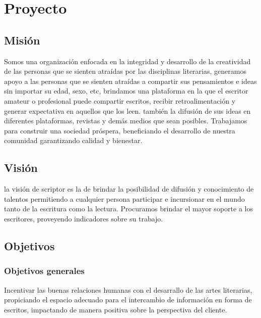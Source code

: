 \chapter{Proyecto}

\section{Misión}
	Somos una organización enfocada en la integridad y desarrollo de la creatividad de las personas que se sienten atraídas por las disciplinas literarias, generamos apoyo a las personas que se sienten atraídas a compartir sus pensamientos e ideas sin importar su edad, sexo, etc, brindamos una plataforma en la que el escritor amateur o profesional puede compartir escritos, recibir retroalimentación y generar expectativa en aquellos que los leen. también la difusión de sus ideas en diferentes plataformas, revistas y demás medios que sean posibles. 
	Trabajamos para construir una sociedad próspera, beneficiando el desarrollo de nuestra comunidad garantizando calidad y bienestar.


\section{Visión}
la visión de scriptor es la de brindar la posibilidad de difusión y conocimiento de talentos permitiendo a cualquier persona participar e incursionar en el mundo tanto de la escritura como la lectura. Procuramos brindar el mayor soporte a los escritores, proveyendo indicadores sobre su trabajo.

\section{Objetivos}

\subsection{Objetivos generales}
Incentivar las buenas relaciones humanas con el desarrallo de las artes literarias, propiciando el espacio adecuado para el intercambio de información en forma de escritos, impactando de manera positiva sobre la perspectiva del cliente.








